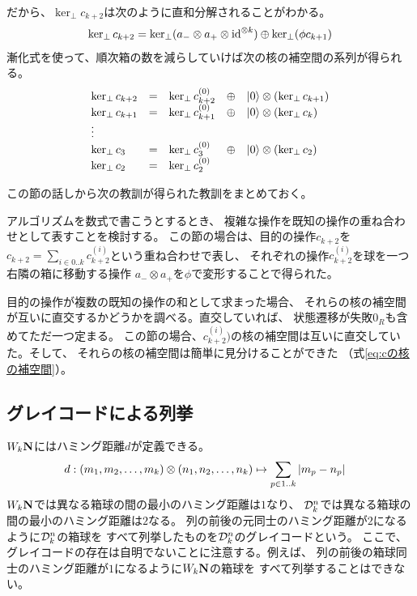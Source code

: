 	だから、$\ker_\perp c_{k+2}$は次のように直和分解されることがわかる。
	\begin{equation*}\begin{split} %
		\ker_\perp c_{k+2} 
		&= \ker_\perp(a_-\otimes a_+\otimes\myid^{\otimes k})
			\oplus \ker_\perp(\phi c_{k+1}) \\
	\end{split}\end{equation*} %
	漸化式を使って、順次箱の数を減らしていけば次の核の補空間の系列が得られる。
	\begin{equation*}\begin{array}{lclcl} %
		\ker_\perp c_{k+2} &=& \ker_\perp c_{k+2}^{(0)}
			&\oplus& \ket{0}\otimes(\ker_\perp c_{k+1}) \\
		\ker_\perp c_{k+1} &=& \ker_\perp c_{k+1}^{(0)}
			&\oplus& \ket{0}\otimes(\ker_\perp c_{k}) \\
		\vdots & \\
		\ker_\perp c_{3} &=& \ker_\perp c_3^{(0)}
			&\oplus& \ket{0}\otimes(\ker_\perp c_{2}) \\
		\ker_\perp c_{2} &=& \ker_\perp c_2^{(0)}
	\end{array}\end{equation*} %

	この節の話しから次の教訓が得られた教訓をまとめておく。
	\begin{description}\setlength{\itemsep}{-1mm} %
		\item[操作の重ねあわせ] アルゴリズムを数式で書こうとするとき、
		複雑な操作を既知の操作の重ね合わせとして表すことを検討する。
		この節の場合は、目的の操作$c_{k+2}$を
		$c_{k+2}=\sum_{i\in0..k}c_{k+2}^{(i)}$という重ね合わせで表し、
		それぞれの操作$c_{k+2}^{(i)}$を球を一つ右隣の箱に移動する操作
		$a_-\otimes a_+$を$\phi$で変形することで得られた。
		\item[核の補空間] 目的の操作が複数の既知の操作の和として求まった場合、
		それらの核の補空間が互いに直交するかどうかを調べる。直交していれば、
		状態遷移が失敗$0_R$も含めてただ一つ定まる。
		この節の場合、$c_{k+2}^{(i)})$の核の補空間は互いに直交していた。そして、
		それらの核の補空間は簡単に見分けることができた
		（式\eqref{eq:cの核の補空間}）。
	\end{description} %
\subsection{グレイコードによる列挙}\label{s2:グレイコードによる列挙} %
	$W_k{\mathbf{N}}$にはハミング距離$d$が定義できる。
	\begin{equation*}\begin{split} %
		d:(m_1,m_2,\dots,m_k)\otimes(n_1,n_2,\dots,n_k)
		&\mapsto \sum_{p\in1..k}\zettai{m_p-n_p}
	\end{split}\end{equation*} %
	$W_k{\mathbf{N}}$では異なる箱球の間の最小のハミング距離は$1$なり、
	${\mathcal{D}}_k^n$では異なる箱球の間の最小のハミング距離は$2$なる。
	列の前後の元同士のハミング距離が$2$になるように${\mathcal{D}}_k^n$の箱球を
	すべて列挙したものを${\mathcal{D}}_k^n$のグレイコードという。
	ここで、グレイコードの存在は自明でないことに注意する。例えば、
	列の前後の箱球同士のハミング距離が$1$になるように$W_k{\mathbf{N}}$の箱球を
	すべて列挙することはできない。

